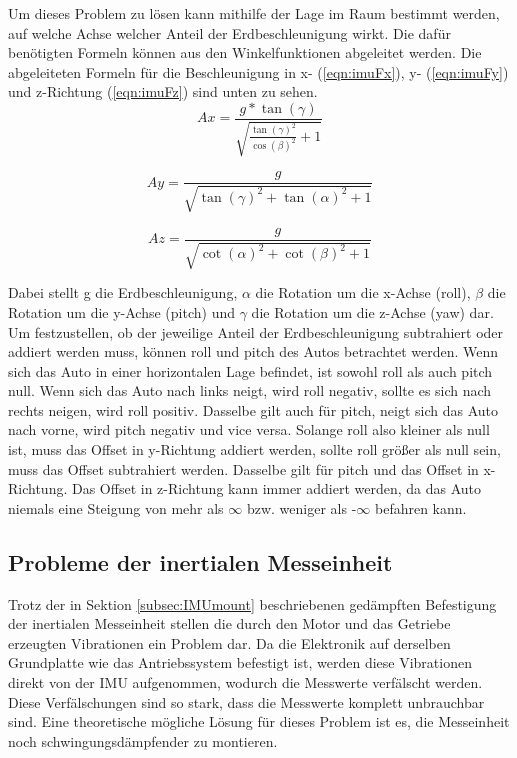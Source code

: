Um dieses Problem zu lösen kann mithilfe der Lage im Raum bestimmt werden, auf welche Achse welcher Anteil der Erdbeschleunigung  wirkt. Die dafür benötigten Formeln können aus den Winkelfunktionen abgeleitet werden.
Die abgeleiteten Formeln für die Beschleunigung in x- (\ref{eqn:imuFx}), y- (\ref{eqn:imuFy}) und z-Richtung (\ref{eqn:imuFz}) sind unten zu sehen.
\begin{equation}
Ax=\frac{g*\tan(\gamma)}{\sqrt{\frac{\tan(\gamma)^2}{\cos(\beta)^2}+1}}
\label{eqn:imuFx}
\end{equation}

\begin{equation}
Ay=\frac{g}{\sqrt{\tan(\gamma)^2+\tan(\alpha)^2+1}}
\label{eqn:imuFy}
\end{equation}

\begin{equation}
Az=\frac{g}{\sqrt{\cot(\alpha)^2+\cot(\beta)^2+1}}
\label{eqn:imuFz}
\end{equation}

Dabei stellt g die Erdbeschleunigung, $\alpha$ die Rotation um die x-Achse (roll), $\beta$ die Rotation um die y-Achse (pitch) und $\gamma$ die Rotation um die z-Achse (yaw) dar. \\
Um festzustellen, ob der jeweilige Anteil der Erdbeschleunigung subtrahiert oder addiert werden muss, können roll und pitch des Autos betrachtet werden. Wenn sich das Auto in einer horizontalen Lage befindet, ist sowohl roll als auch pitch null. Wenn sich das Auto nach links neigt, wird roll negativ, sollte es sich nach rechts neigen, wird roll positiv. Dasselbe gilt auch für pitch, neigt sich das Auto nach vorne, wird pitch negativ und vice versa. Solange roll also kleiner als null ist, muss das Offset in y-Richtung addiert werden, sollte roll größer als null sein, muss das Offset subtrahiert werden. Dasselbe gilt für pitch und das Offset in x-Richtung. Das Offset in z-Richtung kann immer addiert werden, da das Auto niemals eine Steigung von mehr als $\infty$ bzw. weniger als -$\infty$ befahren kann.

\subsection{Probleme der inertialen Messeinheit}
\label{subsec:IMUproblems}
Trotz der in Sektion \ref{subsec:IMUmount} beschriebenen gedämpften Befestigung der inertialen Messeinheit stellen die durch den Motor und das Getriebe erzeugten Vibrationen ein Problem dar. Da die Elektronik auf derselben Grundplatte wie das Antriebssystem befestigt ist, werden diese Vibrationen direkt von der \ac{IMU} aufgenommen, wodurch die Messwerte verfälscht werden. Diese Verfälschungen sind so stark, dass die Messwerte komplett unbrauchbar sind. Eine theoretische mögliche Lösung für dieses Problem ist es, die Messeinheit noch schwingungsdämpfender zu montieren. 